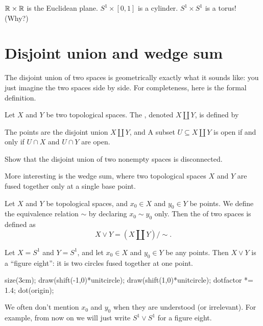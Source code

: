 \begin{example}
	\listhack
	\begin{enumerate}[(a)]
		\ii $\mathbb R \times \mathbb R$ is the Euclidean plane.
		\ii $S^1 \times [0,1]$ is a cylinder.
		\ii $S^1 \times S^1$ is a torus! (Why?)
	\end{enumerate}
\end{example}

\section{Disjoint union and wedge sum}

The disjoint union of two spaces is geometrically exactly
what it sounds like: you just imagine the two spaces side by side.
For completeness, here is the formal definition.
\begin{definition}
	Let $X$ and $Y$ be two topological spaces.
	The , denoted $X \amalg Y$, is defined by
	\begin{itemize}
		\ii The points are the disjoint union $X \amalg Y$, and
		\ii A subset $U \subseteq X \amalg Y$ is open if
		and only if $U \cap X$ and $U \cap Y$ are open.
	\end{itemize}
\end{definition}
\begin{exercise}
	Show that the disjoint union of two nonempty spaces is disconnected.
\end{exercise}

More interesting is the wedge sum, where two topological spaces $X$
and $Y$ are fused together only at a single base point.
\begin{definition}
	Let $X$ and $Y$ be topological spaces, and $x_0 \in X$ and $y_0 \in Y$
	be points.
	We define the equivalence relation $\sim$ by declaring $x_0 \sim y_0$ only.
	Then the  of two spaces is defined as
	\[ X \vee Y = (X \amalg Y) / {\sim}. \]
\end{definition}

\begin{example}
	Let $X = S^1$ and $Y = S^1$,
	and let $x_0 \in X$ and $y_0 \in Y$ be any points.
	Then $X \vee Y$ is a ``figure eight'': it is two
	circles fused together at one point.
	\begin{center}
		\begin{asy}
			size(3cm);
			draw(shift(-1,0)*unitcircle);
			draw(shift(1,0)*unitcircle);
			dotfactor *= 1.4;
			dot(origin);
		\end{asy}
	\end{center}
\end{example}
\begin{abuse}
	We often don't mention $x_0$ and $y_0$ when they are understood
	(or irrelevant).  For example, from now on we will just
	write $S^1 \vee S^1$ for a figure eight.
\end{abuse}


